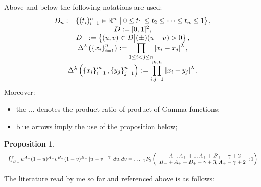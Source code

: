 \documentclass[a4paper,12pt]{article}
\newtheorem*{proposition*}{Proposition}
\begin{document}
Above and below the following notations are used:\begin{equation*}
		\begin{array}[]{c}
			D_n:=\left\{ (t_i)_{i=1}^{n}\in\R^n\mid0\le t_1\le t_2\le\dots\le t_n\le1 \right\},\\
			D:=[0,1]^2,\\
			D_{\pm}:=\mysetn{\left( u,v \right)\in D}{(\pm)(u-v)>0},\\
			\displaystyle\Delta^\lambda\left( \left\{ x_i \right\}_{i=1}^n \right):=\prod_{1\le i<j\le n}\myabs{x_i-x_j}^{\lambda},\\
			\displaystyle\Delta^\lambda\left( \left\{ x_i \right\}_{i=1}^m,\left\{ y_j \right\}_{j=1}^n \right):=\prod_{i,j=1}^{m,n}\myabs{x_i-y_j}^\lambda.
		\end{array}
	\end{equation*}
	Moreover:\begin{itemize}
		\item the $\dots$ denotes the product ratio of product of Gamma functions;
		\item blue arrows imply the use of the proposition below;
	\end{itemize}
\begin{proposition*}
	\begin{equation*}
		\begin{array}[]{c}
			\iint_{D_-}u^{A_+}(1-u)^{A_-}v^{B_+}(1-v)^{B_-}\myabs{u-v}^{-\gamma}\;du\;dv=\dots\;_3F_2\left( \begin{array}[]{c}
				-A_-,A_++1,A_++B_+-\gamma+2\\
				B_-+A_++B_+-\gamma+3,A_+-\gamma+2
			\end{array};1\right)
		\end{array}
	\end{equation*}
\end{proposition*}
The literature read by me so far and referenced above is as follows:
\small
\nocite{*}


\end{document}
